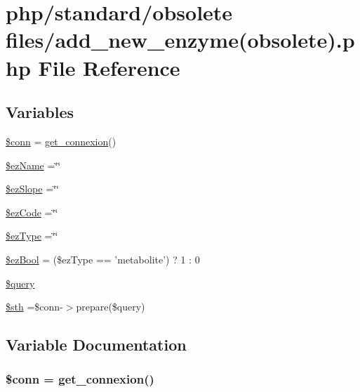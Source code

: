 \hypertarget{add__new__enzyme_07obsolete_08_8php}{\section{php/standard/obsolete files/add\-\_\-new\-\_\-enzyme(obsolete).php File Reference}
\label{add__new__enzyme_07obsolete_08_8php}
}
\subsection*{Variables}
\begin{DoxyCompactItemize}
\item 
\hyperlink{add__new__enzyme_07obsolete_08_8php_aa8a5a87b9c1a6a0819b88447cbe41877}{\$conn} = \hyperlink{php__functions_8php_ace18bc10f3fd08f92688ac743e0d8c2e}{get\-\_\-connexion}()
\item 
\hyperlink{add__new__enzyme_07obsolete_08_8php_a57a9615262224b8dda435a084ba02406}{\$ez\-Name} =\char`\"{}\char`\"{}
\item 
\hyperlink{add__new__enzyme_07obsolete_08_8php_a1efbb279669bdab5d5eaff4f289c71a2}{\$ez\-Slope} =\char`\"{}\char`\"{}
\item 
\hyperlink{add__new__enzyme_07obsolete_08_8php_a1a28f4870dd5aff7acdc3184a85a30c7}{\$ez\-Code} =\char`\"{}\char`\"{}
\item 
\hyperlink{add__new__enzyme_07obsolete_08_8php_aee528badcb788c913ffab530a5b876cf}{\$ez\-Type} =\char`\"{}\char`\"{}
\item 
\hyperlink{add__new__enzyme_07obsolete_08_8php_ae824a6c0e1560b8ae6c0bdd6fd460078}{\$ez\-Bool} = (\$ez\-Type == 'metabolite') ? 1 \-: 0
\item 
\hyperlink{add__new__enzyme_07obsolete_08_8php_af59a5f7cd609e592c41dc3643efd3c98}{\$query}
\item 
\hyperlink{add__new__enzyme_07obsolete_08_8php_afa9126f9664959c02795be300a135f93}{\$sth} =\$conn-\/$>$prepare(\$query)
\end{DoxyCompactItemize}


\subsection{Variable Documentation}
\hypertarget{add__new__enzyme_07obsolete_08_8php_aa8a5a87b9c1a6a0819b88447cbe41877}{
\subsubsection[{\$conn}]{\setlength{\rightskip}{0pt plus 5cm}\$conn = {\bf get\-\_\-connexion}()}}\label{add__new__enzyme_07obsolete_08_8php_aa8a5a87b9c1a6a0819b88447cbe41877}


